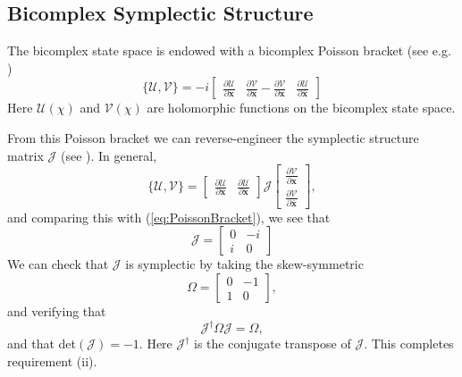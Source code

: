 \documentclass{article}
\begin{document}
\subsection{Bicomplex Symplectic Structure}
\label{sec: struc}
The bicomplex state space is endowed with a bicomplex Poisson bracket (see e.g. \cite{NOVAES2004})
\begin{equation}
\label{eq:PoissonBracket}
\{\mathcal{U},\mathcal{V}\} =
-i \begin{bmatrix}
    \frac{\partial \mathcal{U}}{\partial \textbf{x}}&\frac{\partial \mathcal{V}}{\partial \bar{\textbf{x}}} 
    -
        \frac{\partial \mathcal{V}}{\partial \textbf{x}}&\frac{\partial \mathcal{U}}{\partial \bar{\textbf{x}}} 
    \end{bmatrix}
\end{equation}
Here $\mathcal{U}(\chi)$ and $\mathcal{V}(\chi)$ are holomorphic functions on the bicomplex state space.  




From this Poisson bracket we can reverse-engineer the symplectic structure matrix $\mathcal{J}$ (see \cite[p.~65]{marsden}).  In general, 
\begin{equation}
\label{eq: comppois}
    \{\mathcal{U},\mathcal{V}\} = \begin{bmatrix}
    \frac{\partial \mathcal{U}}{\partial \textbf{x}}&\frac{\partial \mathcal{U}}{\partial \bar{\textbf{x}}}
    \end{bmatrix} 
\mathcal{J}
    \begin{bmatrix}
    \frac{\partial \mathcal{V}}{\partial \textbf{x}}\\
    \frac{\partial \mathcal{V}}{\partial \bar{\textbf{x}}}
    \end{bmatrix},
\end{equation}
and comparing this with (\ref{eq:PoissonBracket}), we see that
\begin{equation}
\label{eq: structure}
    \mathcal{J}= \begin{bmatrix}
    0&-i\\i&0
    \end{bmatrix}
\end{equation}
We can check that $\mathcal{J}$ is symplectic by taking the skew-symmetric
\begin{equation*}
    \Omega = \begin{bmatrix}
    0&-1\\1&0
    \end{bmatrix},
\end{equation*}
and verifying that  
\begin{equation}
    \mathcal{J}^\dagger\Omega\mathcal{J}=\Omega,
\end{equation}
and that det$(\mathcal{J})=-1$. %
Here $\mathcal{J}^\dagger$ is the conjugate transpose of $\mathcal{J}$.  This completes requirement (ii).
\end{document}
